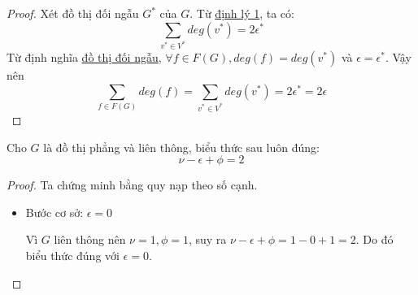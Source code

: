 \begin{proof}
    Xét đồ thị đối ngẫu $G^*$ của $G$. Từ \hyperref[thr:v2e]{định lý 1}, ta có:
    $$\sum_{v^* \in V^*}deg(v^*) = 2\epsilon^*$$
    Từ định nghĩa \hyperref[def:dualgraph]{đồ thị đối ngẫu}, $\forall f \in F(G), deg(f)=deg(v^*)$ và $\epsilon = \epsilon^*$. Vậy nên
    $$\sum_{f \in F(G)}deg(f) = \sum_{v^* \in V^*}deg(v^*) = 2\epsilon^* = 2\epsilon$$
\end{proof}
\begin{theorem}
    \label{thr:euler}
    Cho $G$ là đồ thị phẳng và liên thông, biểu thức sau luôn đúng: $$\nu -\epsilon+\phi=2$$
\end{theorem}
\begin{proof}
    Ta chứng minh bằng quy nạp theo số cạnh.

    \begin{itemize}

        \item Bước cơ sở: $\epsilon=0$

              Vì $G$ liên thông nên $\nu=1, \phi = 1$, suy ra $\nu-\epsilon+\phi = 1 - 0 + 1 = 2$.
              Do đó biểu thức đúng với $\epsilon = 0$.


\end{itemize}
\end{proof}

